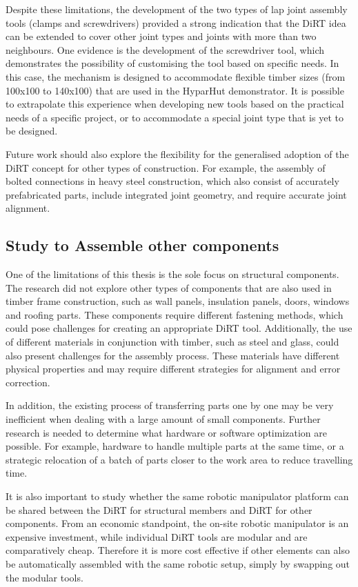 Despite these limitations, the development of the two types of lap joint assembly tools (clamps and screwdrivers) provided a strong indication that the DiRT idea can be extended to cover other joint types and joints with more than two neighbours. One evidence is the development of the screwdriver tool, which demonstrates the possibility of customising the tool based on specific needs. In this case, the mechanism is designed to accommodate flexible timber sizes (from 100x100 to 140x100) that are used in the HyparHut demonstrator. It is possible to extrapolate this experience when developing new tools based on the practical needs of a specific project, or to accommodate a special joint type that is yet to be designed. 

Future work should also explore the flexibility for the generalised adoption of the DiRT concept for other types of construction. For example, the assembly of bolted connections in heavy steel construction, which also consist of accurately prefabricated parts, include integrated joint geometry, and require accurate joint alignment. 

\subsection{Study to Assemble other components}
\label{subsection:study_to_assemble_other_components}

One of the limitations of this thesis is the sole focus on structural components. The research did not explore other types of components that are also used in timber frame construction, such as wall panels, insulation panels, doors, windows and roofing parts. These components require different fastening methods, which could pose challenges for creating an appropriate DiRT tool. Additionally, the use of different materials in conjunction with timber, such as steel and glass, could also present challenges for the assembly process. These materials have different physical properties and may require different strategies for alignment and error correction.

In addition, the existing process of transferring parts one by one may be very inefficient when dealing with a large amount of small components. Further research is needed to determine what hardware or software optimization are possible. For example, hardware to handle multiple parts at the same time, or a strategic relocation of a batch of parts closer to the work area to reduce travelling time. 

It is also important to study whether the same robotic manipulator platform can be shared between the DiRT for structural members and DiRT for other components. From an economic standpoint, the on-site robotic manipulator is an expensive investment, while individual DiRT tools are modular and are comparatively cheap. Therefore it is more cost effective if other elements can also be automatically assembled with the same robotic setup, simply by swapping out the modular tools.

